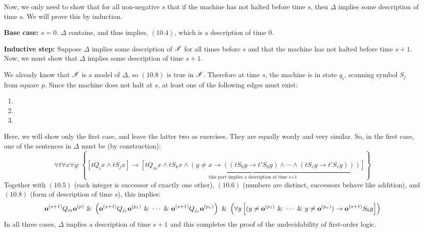 Now, we only need to show that for all non-negative $s$ that if the machine has not halted before time $s$, then $\Delta$ implies some description of time $s$. We will prove this by induction.

\noindent\textbf{Base case:} $s=0$. $\Delta$ contains, and thus implies, $(10.4)$, which is a description of time $0$.

\noindent\textbf{Inductive step:} Suppose $\Delta$ implies some description of $\mathscr{I}$ for all times before $s$ and that the machine has not halted before time $s+1$. Now, we must show that $\Delta$ implies some description of time $s+1$.

We already know that $\mathscr{I}$ is a model of $\Delta$, so $(10.8)$ is true in $\mathscr{I}$. Therefore at time $s$, the machine is in state $q_i$, scanning symbol $S_j$ from square $p$. Since the machine does not halt at $s$, at least one of the following edges must exist:
\begin{enumerate}
\item {}
\item {}
\item {}
\end{enumerate}

Here, we will show only the first case, and leave the latter two as exercises. They are equally wordy and very similar. So, in the first case, one of the sentences in $\Delta$ must be (by construction):
$$\forall t\forall x\forall y: \left\{ \left[t Q_i x \land t S_j x\right] \to \underbrace{\left[t Q_m x \land t S_k x \land (y \neq x \to ((t S_0 y \to t' S_0 y) \land \cdots \land (t S_r y \to t' S_r y)))\right]}_{\text{this part implies a description of time s+1}} \right\}$$
Together with $(10.5)$ (each integer is successor of exactly one other), $(10.6)$ (numbers are distinct, successors behave like addition), and $(10.8)$ (form of description of time $s$), this implies:
$$\mathbf{o}^{(s+1)} Q_m \mathbf{o}^{(p)} ~\&~ \left( \mathbf{o}^{(s+1)} Q_{j_1} \mathbf{o}^{(p_1)} ~\&~ \cdots ~\&~ \mathbf{o}^{(s+1)} Q_{j_v} \mathbf{o}^{(p_v)}\right) ~\&~ \left(\forall y \left[ (y \neq \mathbf{o}^{(p_1)} ~\&~ \cdots ~\&~ y \neq \mathbf{o}^{(p_v)}) \to \mathbf{o}^{(s+1)} S_0 y \right]\right)$$
In all three cases, $\Delta$ implies a description of time $s+1$ and this completes the proof of the undecidability of first-order logic.